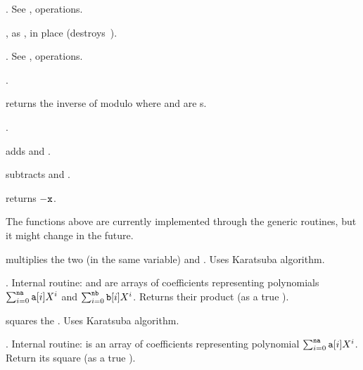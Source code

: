 . See ,  operations.






, as , in
place (destroys~).


. See ,  operations.


.

 returns the inverse of  modulo 
where  and  are s.

.

 adds  and . 

 subtracts  and . 

 returns $-{\tt x}$.

The functions above are currently implemented through the generic routines,
but it might change in the future.

 multiplies the two  (in the same
variable)  and . Uses Karatsuba algorithm.

. Internal routine:
 and  are arrays of coefficients representing polynomials
$\sum_{i = 0}^{{\tt na}} {\tt a}[i] X^i$ and
$\sum_{i = 0}^{{\tt nb}} {\tt b}[i] X^i$. Returns their product (as a true
).

 squares the  . Uses Karatsuba
algorithm.

. Internal routine:
 is an array of coefficients representing polynomial
$\sum_{i = 0}^{{\tt na}} {\tt a}[i] X^i$. Return its square (as a true
).


